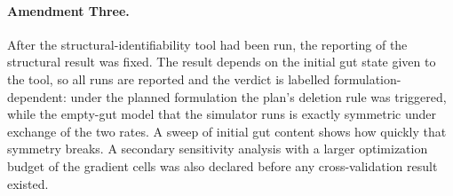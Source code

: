 \paragraph{Amendment Three.}
After the structural-identifiability tool had been run, the reporting of the structural result was fixed.
The result depends on the initial gut state given to the tool, so all runs are reported and the verdict is
labelled formulation-dependent: under the planned formulation the plan's deletion rule was triggered,
while the empty-gut model that the simulator runs is exactly symmetric under exchange of the two rates.
A sweep of initial gut content shows how quickly that symmetry breaks. A secondary sensitivity analysis with a larger optimization budget
of the gradient cells was also declared before any cross-validation result existed.
